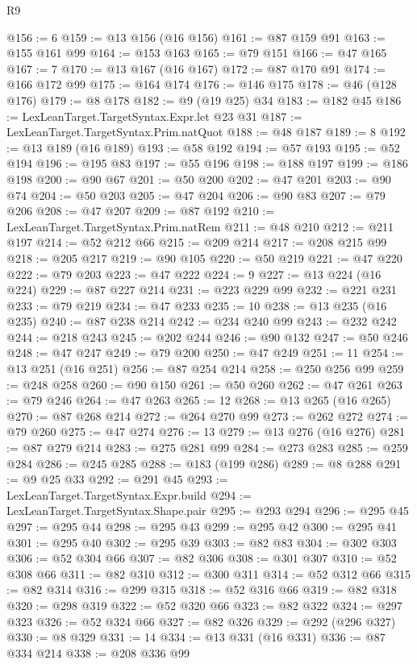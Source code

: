 \begin{lexlean}{R9}
\begin{coremodule}
@156 := 6
@159 := @13 @156 (@16 @156)
@161 := @87 @159 @91
@163 := @155 @161 @99
@164 := @153 @163
@165 := @79 @151
@166 := @47 @165
@167 := 7
@170 := @13 @167 (@16 @167)
@172 := @87 @170 @91
@174 := @166 @172 @99
@175 := @164 @174
@176 := @146 @175
@178 := @46 (@128 @176)
@179 := @8 @178
@182 := @9 (@19 @25) @34
@183 := @182 @45
@186 := LexLeanTarget.TargetSyntax.Expr.let @23 @31
@187 := LexLeanTarget.TargetSyntax.Prim.natQuot
@188 := @48 @187
@189 := 8
@192 := @13 @189 (@16 @189)
@193 := @58 @192
@194 := @57 @193
@195 := @52 @194
@196 := @195 @83
@197 := @55 @196
@198 := @188 @197
@199 := @186 @198
@200 := @90 @67
@201 := @50 @200
@202 := @47 @201
@203 := @90 @74
@204 := @50 @203
@205 := @47 @204
@206 := @90 @83
@207 := @79 @206
@208 := @47 @207
@209 := @87 @192
@210 := LexLeanTarget.TargetSyntax.Prim.natRem
@211 := @48 @210
@212 := @211 @197
@214 := @52 @212 @66
@215 := @209 @214
@217 := @208 @215 @99
@218 := @205 @217
@219 := @90 @105
@220 := @50 @219
@221 := @47 @220
@222 := @79 @203
@223 := @47 @222
@224 := 9
@227 := @13 @224 (@16 @224)
@229 := @87 @227 @214
@231 := @223 @229 @99
@232 := @221 @231
@233 := @79 @219
@234 := @47 @233
@235 := 10
@238 := @13 @235 (@16 @235)
@240 := @87 @238 @214
@242 := @234 @240 @99
@243 := @232 @242
@244 := @218 @243
@245 := @202 @244
@246 := @90 @132
@247 := @50 @246
@248 := @47 @247
@249 := @79 @200
@250 := @47 @249
@251 := 11
@254 := @13 @251 (@16 @251)
@256 := @87 @254 @214
@258 := @250 @256 @99
@259 := @248 @258
@260 := @90 @150
@261 := @50 @260
@262 := @47 @261
@263 := @79 @246
@264 := @47 @263
@265 := 12
@268 := @13 @265 (@16 @265)
@270 := @87 @268 @214
@272 := @264 @270 @99
@273 := @262 @272
@274 := @79 @260
@275 := @47 @274
@276 := 13
@279 := @13 @276 (@16 @276)
@281 := @87 @279 @214
@283 := @275 @281 @99
@284 := @273 @283
@285 := @259 @284
@286 := @245 @285
@288 := @183 (@199 @286)
@289 := @8 @288
@291 := @9 @25 @33
@292 := @291 @45
@293 := LexLeanTarget.TargetSyntax.Expr.build
@294 := LexLeanTarget.TargetSyntax.Shape.pair
@295 := @293 @294
@296 := @295 @45
@297 := @295 @44
@298 := @295 @43
@299 := @295 @42
@300 := @295 @41
@301 := @295 @40
@302 := @295 @39
@303 := @82 @83
@304 := @302 @303
@306 := @52 @304 @66
@307 := @82 @306
@308 := @301 @307
@310 := @52 @308 @66
@311 := @82 @310
@312 := @300 @311
@314 := @52 @312 @66
@315 := @82 @314
@316 := @299 @315
@318 := @52 @316 @66
@319 := @82 @318
@320 := @298 @319
@322 := @52 @320 @66
@323 := @82 @322
@324 := @297 @323
@326 := @52 @324 @66
@327 := @82 @326
@329 := @292 (@296 @327)
@330 := @8 @329
@331 := 14
@334 := @13 @331 (@16 @331)
@336 := @87 @334 @214
@338 := @208 @336 @99

\end{coremodule}
\end{lexlean}
